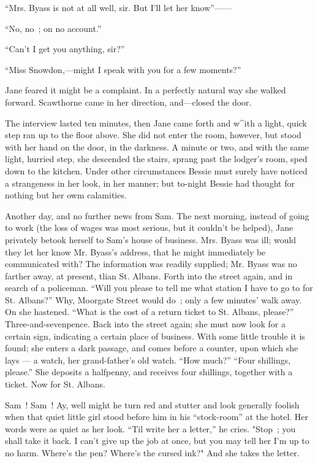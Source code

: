 ``Mrs. Byass is not at all well, sir. But I'll let her know''------

``No, no~; on no account.''

``Can't I get you anything, sir?''

{\protect\hypertarget{296}{}{}} ``Miss Snowdon,---might I speak with you
for a few moments?''

Jane feared it might be a complaint. In a perfectly natural way she
walked forward. Scawthorne came in her direction, and---closed the door.

The interview lasted ten minutes, then Jane came forth and w\^{}ith a
light, quick step ran up to the floor above. She did not enter the room,
however, but stood with her hand on the door, in the darkness. A minute
or two, and with the same light, hurried step, she descended the stairs,
sprang past the lodger's room, sped down to the kitchen. Under other
circumstances Bessie must surely have noticed a strangeness in her look,
in her manner; but to-night Bessie had thought for nothing but her owm
calamities.

Another day, and no further news from Sam. The next morning, instead of
going to work (the loss of wages was most serious, but it couldn't be
helped), Jane privately betook herself to Sam's house of business. Mrs.
Byass was ill; would they let her know Mr. Byass's address, that he
might immediately be communicated with? The information was
{\protect\hypertarget{297}{}{}} readily supplied; Mr. Byass was no
farther away, at present, tlian St. Albans. Forth into the street again,
and in search of a policeman. ``Will you please to tell me what station
I have to go to for St. Albans?'' Why, Moorgate Street would do~; only a
few minutes' walk away. On she hastened. ``What is the cost of a return
ticket to St. Albans, please?'' Three-and-sevenpence. Back into the
street again; she must now look for a certain sign, indicating a certain
place of business. With some little trouble it is found; she enters a
dark passage, and comes before a counter, upon which she lays --- a
watch, her grand-father's old watch. ``How much?'' ``Four shillings,
please.'' She deposits a halfpenny, and receives four shillings,
together with a ticket. Now for St. Albans.

Sam~! Sam~! Ay, well might he turn red and stutter and look generally
foolish when that quiet little girl stood before him in his
``stock-room'' at the hotel. Her words were as quiet as her look. ``Til
write her a letter,'' he cries. "Stop~; you shall take it back. I can't
give up the job at once, but you may tell her I'm up to no harm. Where's
the pen? {\protect\hypertarget{298}{}{}} Where's the cursed ink?" And
she takes the letter.

